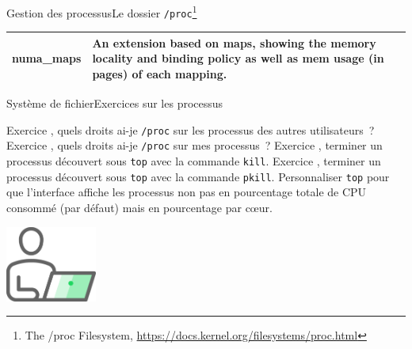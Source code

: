 \documentclass{beamer}
\begin{document}
\begin{frame}{Gestion des processus}{Le dossier \lstinline{/proc}\footnote{The /proc Filesystem, \url{https://docs.kernel.org/filesystems/proc.html}}}
\begin{footnotesize}
\begin{tiny}
\begin{table}[h!]
\begin{tabular}{|p{1.5cm}|p{9cm}|}
                        \hline
                        numa\_maps    & An extension based on maps, showing the memory locality and binding policy as well as mem usage (in pages) of each mapping. \\
                        \hline
                    \end{tabular}
                \end{table}
            \end{tiny}
        \end{footnotesize}
    \end{frame}

    \begin{frame}{Système de fichier}{Exercices sur les processus}
        \begin{small}
            Exercice \execcounterdispinc{}, quels droits ai-je \lstinline{/proc} sur les processus des autres utilisateurs~?
            \bigbreak
            Exercice \execcounterdispinc{}, quels droits ai-je \lstinline{/proc} sur mes processus~?
            \bigbreak
            Exercice \execcounterdispinc{}, terminer un processus découvert sous \lstinline{top} avec la commande \lstinline{kill}.
            \bigbreak
            Exercice \execcounterdispinc{}, terminer un processus découvert sous \lstinline{top} avec la commande \lstinline{pkill}.
            \bigbreak
            Personnaliser \lstinline{top} pour que l'interface affiche les processus non pas en pourcentage totale de CPU consommé (par défaut) mais en pourcentage par cœur.
        \end{small}
        \begin{center}
            \includegraphics[width=3cm]{image/guy-in-front-of-desktop}
        \end{center}
    \end{frame}
\end{document}
